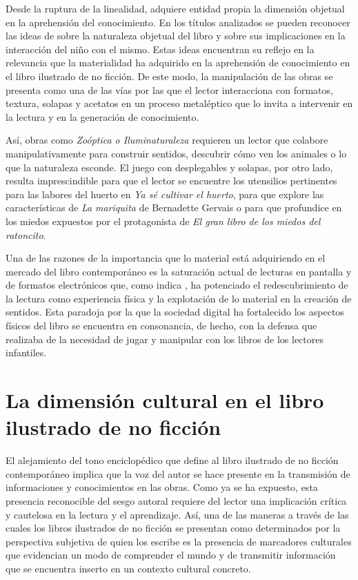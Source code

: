 \documentclass[spanish]{textolivre}
\begin{document}
Desde la ruptura de la linealidad, adquiere entidad propia la dimensión objetual en la aprehensión del conocimiento. En los títulos analizados se pueden reconocer las ideas de \textcite{munari_como_2016} sobre la naturaleza objetual del libro y sobre sus implicaciones en la interacción del niño con el mismo. Estas ideas encuentran su reflejo en la relevancia que la materialidad ha adquirido en la aprehensión de conocimiento en el libro ilustrado de no ficción. De este modo, la manipulación de las obras se presenta como una de las vías por las que el lector interacciona con formatos, textura, solapas y acetatos en un proceso metaléptico que lo invita a intervenir en la lectura y en la generación de conocimiento.

Así, obras como \textit{Zoóptica o Iluminaturaleza} requieren un lector que colabore manipulativamente para construir sentidos, descubrir cómo ven los animales o lo que la naturaleza esconde. El juego con desplegables y solapas, por otro lado, resulta imprescindible para que el lector se encuentre los utensilios pertinentes para las labores del huerto en \textit{Ya sé cultivar el huerto}, para que explore las características de \textit{La mariquita} de Bernadette Gervais o para que profundice en los miedos expuestos por el protagonista de \textit{El gran libro de los miedos del ratoncito}.

Una de las razones de la importancia que lo material está adquiriendo en el mercado del libro contemporáneo es la saturación actual de lecturas en pantalla y de formatos electrónicos que, como indica \textcite{salisbury_true_2020}, ha potenciado el redescubrimiento de la lectura como experiencia física y la explotación de lo material en la creación de sentidos. Esta paradoja por la que la sociedad digital ha fortalecido los aspectos físicos del libro \cite{cordon-garcia_combates_2018} se encuentra en consonancia, de hecho, con la defensa que \textcite{bonnafe_libros_2008} realizaba de la necesidad de jugar y manipular con los libros de los lectores infantiles.

\section{La dimensión cultural en el libro ilustrado de no ficción}\label{sec-modelo}
El alejamiento del tono enciclopédico que define al libro ilustrado de no ficción contemporáneo implica que la voz del autor se hace presente en la transmisión de informaciones y conocimientos en las obras. Como ya se ha expuesto, esta presencia reconocible del sesgo autoral requiere del lector una implicación crítica y cautelosa en la lectura y el aprendizaje. Así, una de las maneras a través de las cuales los libros ilustrados de no ficción se presentan como determinados por la perspectiva subjetiva de quien los escribe es la presencia de marcadores culturales \cite{schapers_especificidad_2016} que evidencian un modo de comprender el mundo y de transmitir información que se encuentra inserto en un contexto cultural concreto.
\end{document}
